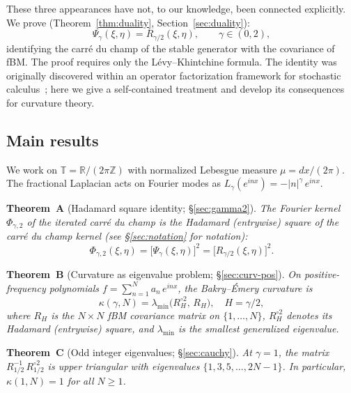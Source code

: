 \documentclass[11pt,a4paper]{article}
\theoremstyle{plain}
\theoremstyle{definition}
\theoremstyle{remark}
\newcommand{\R}{\mathbb{R}}
\newcommand{\Z}{\mathbb{Z}}
\newcommand{\T}{\mathbb{T}}
\begin{document}
These three appearances have not, to our knowledge, been connected
explicitly.  We prove (Theorem~\ref{thm:duality},
Section~\ref{sec:duality}):
\begin{equation}\label{eq:duality-intro}
  \Psi_\gamma(\xi,\eta) = R_{\gamma/2}(\xi,\eta),
  \qquad \gamma \in (0,2),
\end{equation}
identifying the carr\'e du champ of the stable generator with
the covariance of fBM.  The proof requires only the
L\'evy--Khintchine formula.
The identity was originally discovered within an operator
factorization framework for stochastic
calculus~\cite{Fontes2026a}; here we give a self-contained
treatment and develop its consequences for curvature theory.


\subsection{Main results}

We work on $\T = \R/(2\pi\Z)$ with normalized Lebesgue measure
$\mu = dx/(2\pi)$. The fractional Laplacian acts on Fourier modes as
$L_\gamma(e^{inx}) = -|n|^\gamma\,e^{inx}$.

\medskip\noindent
\textbf{Theorem~A} (Hadamard square identity; \S\ref{sec:gamma2}).
\emph{The Fourier kernel $\Phi_{\gamma,2}$ of the iterated carr\'e
du champ is the Hadamard (entrywise) square of the carr\'e du champ
kernel (see \S\ref{sec:notation} for notation):
\begin{equation}\label{eq:intro-A}
  \Phi_{\gamma,2}(\xi,\eta)
  = \bigl[\Psi_\gamma(\xi,\eta)\bigr]^2
  = \bigl[R_{\gamma/2}(\xi,\eta)\bigr]^2.
\end{equation}}

\medskip\noindent
\textbf{Theorem~B} (Curvature as eigenvalue problem; \S\ref{sec:curv-pos}).
\emph{On positive-frequency polynomials $f = \sum_{n=1}^N a_n\,e^{inx}$,
the Bakry--\'Emery curvature is
\begin{equation}\label{eq:intro-B}
  \kappa(\gamma, N) = \lambda_{\min}\!\bigl(R_H^{\circ 2},\, R_H\bigr),
  \quad H = \gamma/2,
\end{equation}
where $R_H$ is the $N \times N$ fBM covariance matrix on $\{1,\ldots,N\}$,
$R_H^{\circ 2}$ denotes its Hadamard (entrywise) square, and
$\lambda_{\min}$ is the smallest generalized eigenvalue.}

\medskip\noindent
\textbf{Theorem~C} (Odd integer eigenvalues; \S\ref{sec:cauchy}).
\emph{At $\gamma = 1$, the matrix $R_{1/2}^{-1}\,R_{1/2}^{\circ 2}$ is
upper triangular with eigenvalues $\{1, 3, 5, \ldots, 2N-1\}$.
In particular, $\kappa(1,N) = 1$ for all $N \geq 1$.}
\end{document}
